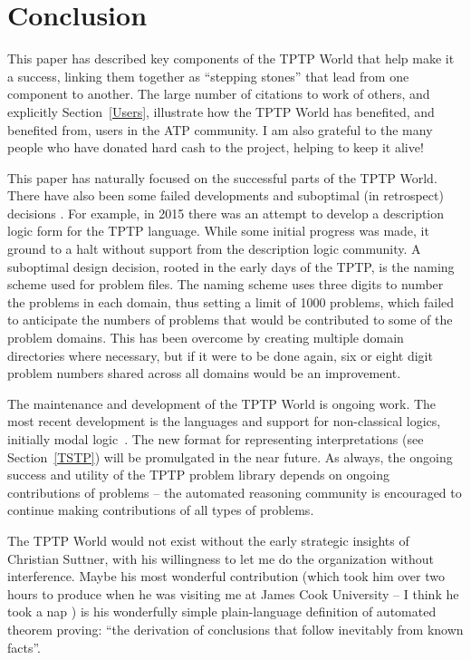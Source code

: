 \documentclass[runningheads]{llncs}
\begin{document}
\section{Conclusion}
\label{Conclusion}

This paper has described key components of the TPTP World that help make it a success,
linking them together as ``stepping stones'' that lead from one component to another.
The large number of citations to work of others, and explicitly Section~\ref{Users}, 
illustrate how the TPTP World has benefited, and benefited from, users in the ATP community.
I am also grateful to the many people who have donated hard cash to the project, helping
to keep it alive!

This paper has naturally focused on the successful parts of the TPTP World.
There have also been some failed developments and suboptimal (in retrospect) decisions \frownie{}.
For example, in 2015 there was an attempt to develop a description logic form for the TPTP 
language. 
While some initial progress was made, it ground to a halt without support from the description 
logic community.
A suboptimal design decision, rooted in the early days of the TPTP, is the naming scheme used for 
problem files. 
The naming scheme uses three digits to number the problems in each domain, thus setting a limit 
of 1000 problems, which failed to anticipate the numbers of problems that would be contributed 
to some of the problem domains.
This has been overcome by creating multiple domain directories where necessary, but if it were 
to be done again, six or eight digit problem numbers shared across all domains would be an 
improvement.

The maintenance and development of the TPTP World is ongoing work.
The most recent development is the languages and support for non-classical logics, initially
modal logic~\cite{SF+22,SS24}.
The new format for representing interpretations (see Section~\ref{TSTP}) will be promulgated in 
the near future.
As always, the ongoing success and utility of the TPTP problem library depends on ongoing 
contributions of problems -- the automated reasoning community is encouraged to continue making 
contributions of all types of problems.

The TPTP World would not exist without the early strategic insights of Christian Suttner,
with his willingness to let me do the organization without interference. 
Maybe his most wonderful contribution (which took him over two hours to produce when he
was visiting me at James Cook University -- I think he took a nap \smiley) is his 
wonderfully simple plain-language definition of automated theorem proving: 
``the derivation of conclusions that follow inevitably from known facts''.



\end{document}
